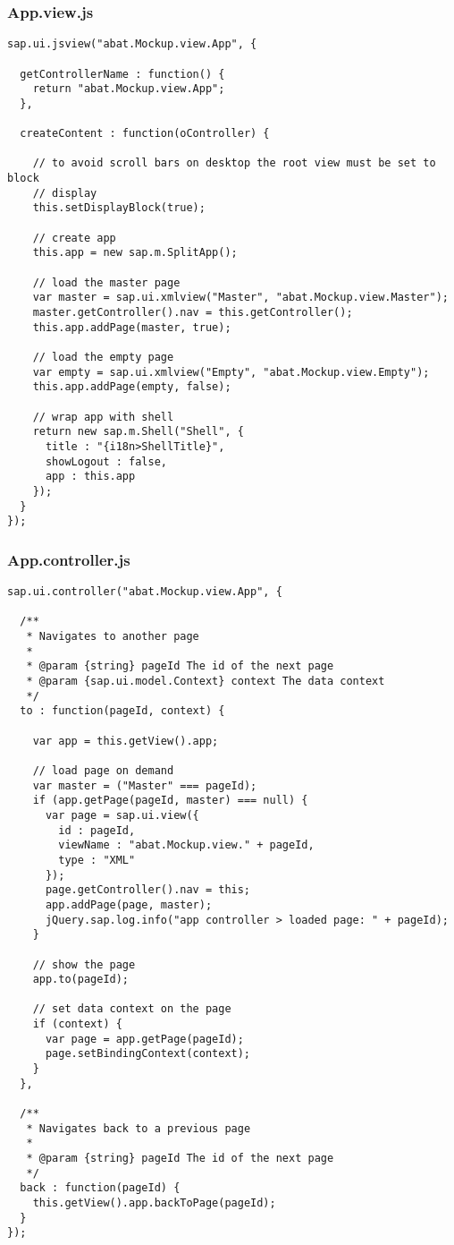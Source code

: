 \newpage
\subsubsection*{App.view.js}
\begin{lstlisting}[frame=htrbl, label=lst:App.view.js]
sap.ui.jsview("abat.Mockup.view.App", {

  getControllerName : function() {
    return "abat.Mockup.view.App";
  },

  createContent : function(oController) {

    // to avoid scroll bars on desktop the root view must be set to block
    // display
    this.setDisplayBlock(true);

    // create app
    this.app = new sap.m.SplitApp();

    // load the master page
    var master = sap.ui.xmlview("Master", "abat.Mockup.view.Master");
    master.getController().nav = this.getController();
    this.app.addPage(master, true);

    // load the empty page
    var empty = sap.ui.xmlview("Empty", "abat.Mockup.view.Empty");
    this.app.addPage(empty, false);

    // wrap app with shell
    return new sap.m.Shell("Shell", {
      title : "{i18n>ShellTitle}",
      showLogout : false,
      app : this.app
    });
  }
});
\end{lstlisting}

\newpage
\subsubsection*{App.controller.js}
\begin{lstlisting}[frame=htrbl, label=lst:App.controller.js]
sap.ui.controller("abat.Mockup.view.App", {

  /**
   * Navigates to another page
   * 
   * @param {string} pageId The id of the next page
   * @param {sap.ui.model.Context} context The data context
   */
  to : function(pageId, context) {

    var app = this.getView().app;

    // load page on demand
    var master = ("Master" === pageId);
    if (app.getPage(pageId, master) === null) {
      var page = sap.ui.view({
        id : pageId,
        viewName : "abat.Mockup.view." + pageId,
        type : "XML"
      });
      page.getController().nav = this;
      app.addPage(page, master);
      jQuery.sap.log.info("app controller > loaded page: " + pageId);
    }

    // show the page
    app.to(pageId);

    // set data context on the page
    if (context) {
      var page = app.getPage(pageId);
      page.setBindingContext(context);
    }
  },

  /**
   * Navigates back to a previous page
   * 
   * @param {string} pageId The id of the next page
   */
  back : function(pageId) {
    this.getView().app.backToPage(pageId);
  }
});
\end{lstlisting}

